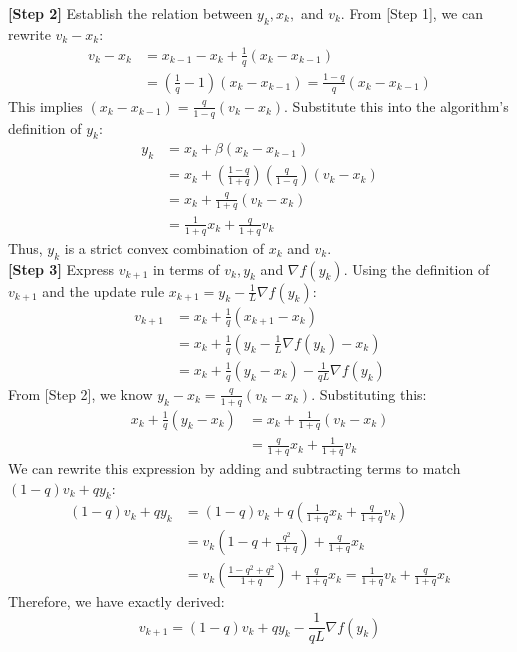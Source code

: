 \documentclass[11pt]{article}
\begin{document}
\textbf{[Step 2]} Establish the relation between $y_k, x_k,$ and $v_k$. 
From [Step 1], we can rewrite $v_k - x_k$:
\begin{align*}
    v_k - x_k &= x_{k-1} - x_k + \frac{1}{q}(x_k - x_{k-1}) \\
    &= \left(\frac{1}{q} - 1\right)(x_k - x_{k-1}) = \frac{1-q}{q}(x_k - x_{k-1})
\end{align*}
This implies $(x_k - x_{k-1}) = \frac{q}{1-q}(v_k - x_k)$. 
Substitute this into the algorithm's definition of $y_k$:
\begin{align*}
    y_k &= x_k + \beta(x_k - x_{k-1}) \\
    &= x_k + \left(\frac{1-q}{1+q}\right) \left(\frac{q}{1-q}\right) (v_k - x_k) \\
    &= x_k + \frac{q}{1+q}(v_k - x_k) \\
    &= \frac{1}{1+q}x_k + \frac{q}{1+q}v_k
\end{align*}
Thus, $y_k$ is a strict convex combination of $x_k$ and $v_k$.
\\[1em]
\textbf{[Step 3]} Express $v_{k+1}$ in terms of $v_k, y_k$ and $\nabla f(y_k)$.
Using the definition of $v_{k+1}$ and the update rule $x_{k+1} = y_k - \frac{1}{L}\nabla f(y_k)$:
\begin{align*}
    v_{k+1} &= x_k + \frac{1}{q}(x_{k+1} - x_k) \\
    &= x_k + \frac{1}{q}\left(y_k - \frac{1}{L}\nabla f(y_k) - x_k\right) \\
    &= x_k + \frac{1}{q}(y_k - x_k) - \frac{1}{qL}\nabla f(y_k)
\end{align*}
From [Step 2], we know $y_k - x_k = \frac{q}{1+q}(v_k - x_k)$. Substituting this:
\begin{align*}
    x_k + \frac{1}{q}(y_k - x_k) &= x_k + \frac{1}{1+q}(v_k - x_k) \\
    &= \frac{q}{1+q}x_k + \frac{1}{1+q}v_k
\end{align*}
We can rewrite this expression by adding and subtracting terms to match $(1-q)v_k + qy_k$:
\begin{align*}
    (1-q)v_k + qy_k &= (1-q)v_k + q\left(\frac{1}{1+q}x_k + \frac{q}{1+q}v_k\right) \\
    &= v_k\left(1 - q + \frac{q^2}{1+q}\right) + \frac{q}{1+q}x_k \\
    &= v_k\left(\frac{1 - q^2 + q^2}{1+q}\right) + \frac{q}{1+q}x_k = \frac{1}{1+q}v_k + \frac{q}{1+q}x_k
\end{align*}
Therefore, we have exactly derived:
$$v_{k+1} = (1-q)v_k + qy_k - \frac{1}{qL}\nabla f(y_k)$$
\end{document}
